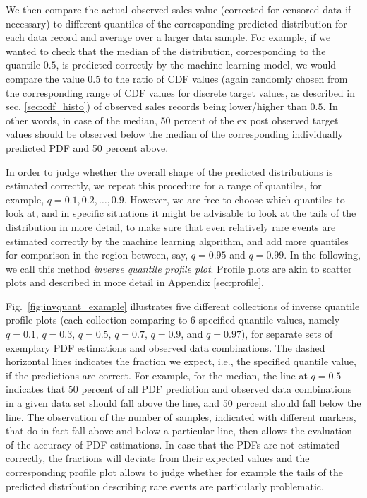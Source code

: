 \documentclass[BCOR=1mm, DIV=calc,10pt,
twoside=true,
twocolumn,
headings=normal]{scrartcl}
\newcommand{\fig}{Fig.~}
\begin{document}
We then compare the actual observed sales value (corrected for censored data if necessary) to different quantiles of the corresponding predicted distribution for each data record and average over a larger data sample. For example, if we wanted to check that the median of the distribution, corresponding to the quantile $0.5$, is predicted correctly by the machine learning model, we would compare the value $0.5$ to the ratio of CDF values (again randomly chosen from the corresponding range of CDF values for discrete target values, as described in sec. \ref{sec:cdf_histo}) of observed sales records being lower/higher than $0.5$. In other words, in case of the median, 50 percent of the ex post observed target values should be observed below the median of the corresponding individually predicted PDF and 50 percent above.

In order to judge whether the overall shape of the predicted distributions is estimated correctly, we repeat this procedure for a range of quantiles, for example, $q = 0.1, 0.2, \ldots, 0.9$. However, we are free to choose which quantiles to look at, and in specific situations it might be advisable to look at the tails of the distribution in more detail, to make sure that even relatively rare events are estimated correctly by the machine learning algorithm, and add more quantiles for comparison in the region between, say, $q = 0.95$ and $q = 0.99$. In the following, we call this method {\em inverse quantile profile plot}. Profile plots are akin to scatter plots and described in more detail in Appendix \ref{sec:profile}.

\fig \ref{fig:invquant_example} illustrates five different collections of inverse quantile profile plots (each collection comparing to 6 specified quantile values, namely $q = 0.1$, $q = 0.3$, $q = 0.5$, $q = 0.7$, $q = 0.9$, and $q = 0.97$), for separate sets of exemplary PDF estimations and observed data combinations. The dashed horizontal lines indicates the fraction we expect, i.e., the specified quantile value, if the predictions are correct. For example, for the median, the line at $q = 0.5$ indicates that  50 percent of all PDF prediction and observed data combinations in a given data set should fall above the line, and 50 percent should fall below the line. The observation of the number of samples, indicated with different markers, that do in fact fall above and below a particular line, then allows the evaluation of the accuracy of PDF estimations. In case that the PDFs are not estimated correctly, the fractions will deviate from their expected values and the corresponding profile plot allows to judge whether for example the tails of the predicted distribution describing rare events are particularly problematic.
\end{document}
